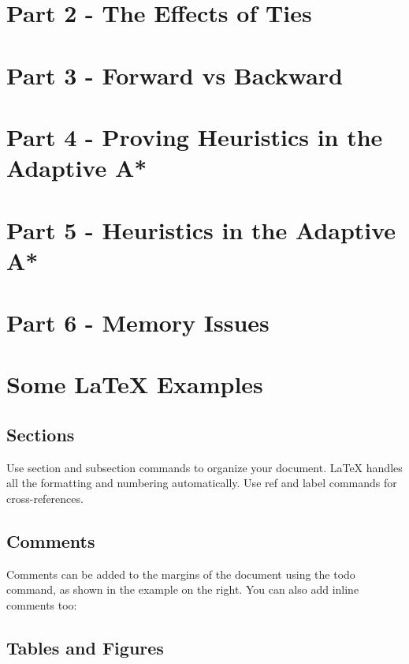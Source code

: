 \documentclass[12pt]{article}
\begin{document}
	\section*{Part 2 - The Effects of Ties}
	
	\section*{Part 3 - Forward vs Backward}
	
	\section*{Part 4 - Proving Heuristics in the Adaptive A*}
	
	\section*{Part 5 - Heuristics in the Adaptive A*}
	
	\section*{Part 6 - Memory Issues}
	
	\iffalse
		\section{Some \LaTeX{} Examples}
		\label{sec:examples}
		
		\subsection{Sections}
		
		Use section and subsection commands to organize your document. \LaTeX{} handles all the formatting and numbering automatically. Use ref and label commands for cross-references.
		
		\subsection{Comments}
		
		Comments can be added to the margins of the document using the  todo command, as shown in the example on the right. You can also add inline comments too:
		
		
		\subsection{Tables and Figures}
		
\end{document}
